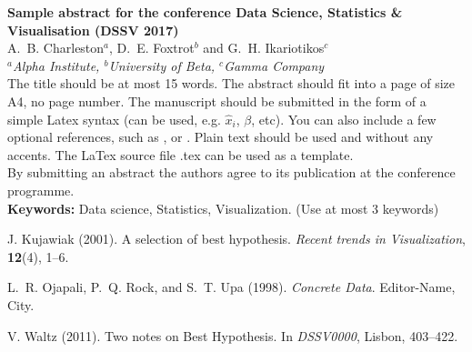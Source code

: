 
\setlength{\textwidth}{160mm}\setlength{\textheight}{240mm}
\setlength{\oddsidemargin}{0mm}\setlength{\evensidemargin}{0mm}
\setlength{\topmargin}{-10mm}
\setlength{\parindent}{0mm} 
\pagestyle{empty}	%



{\Large\bf Sample abstract for the conference Data Science, Statistics \& Visualisation (DSSV 2017) }\\[4mm]

A.~B. Charleston$^a$, D.~E. Foxtrot$^b$ and G.~H. Ikariotikos$^c$\\ 				

{\small \em $^a$Alpha Institute, $^b$University of Beta, $^c$Gamma 
Company}\\[3mm]


The title should be at most 15 words.
The abstract should fit into a page of size A4, no page number. The manuscript should be submitted in the 
form of a simple Latex syntax (can be used, e.g. $\hat{x}_i$, $\beta$, etc). You can also 
include a few optional references, such as \cite{journal01}, \cite{book98} or \cite{procc11}. Plain text should be used and without any accents. The LaTex source file .tex can be used as a 
template.\\

By submitting an abstract the authors agree to its publication at 
the conference programme.\\

\textbf{Keywords:} Data science, Statistics, Visualization. (Use at most 3 keywords)

\begin{thebibliography}{00}
 J. Kujawiak (2001). A selection of best hypothesis. \emph{Recent trends in Visualization}, \textbf{12}(4), 1--6.

L.~R. Ojapali, P.~Q. Rock, and S.~T. Upa (1998). \emph{Concrete Data}. Editor-Name, City.

 V. Waltz (2011). Two notes on Best Hypothesis. In \emph{DSSV0000}, Lisbon, 403--422.
\end{thebibliography}



